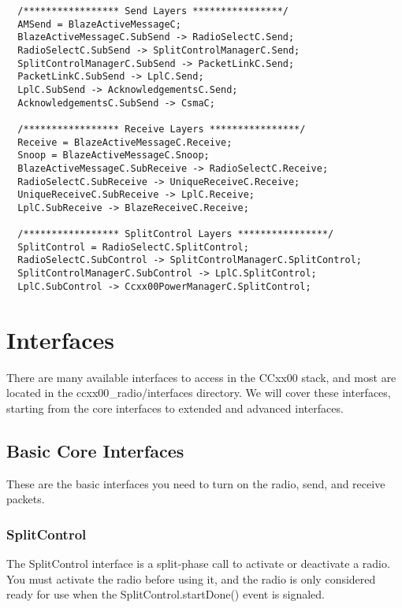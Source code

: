 \documentclass{article}
\begin{document}
\begin{verbatim}  
  /***************** Send Layers ****************/
  AMSend = BlazeActiveMessageC;
  BlazeActiveMessageC.SubSend -> RadioSelectC.Send;
  RadioSelectC.SubSend -> SplitControlManagerC.Send;
  SplitControlManagerC.SubSend -> PacketLinkC.Send;
  PacketLinkC.SubSend -> LplC.Send;
  LplC.SubSend -> AcknowledgementsC.Send;
  AcknowledgementsC.SubSend -> CsmaC;
  
  /***************** Receive Layers ****************/
  Receive = BlazeActiveMessageC.Receive;
  Snoop = BlazeActiveMessageC.Snoop;
  BlazeActiveMessageC.SubReceive -> RadioSelectC.Receive;
  RadioSelectC.SubReceive -> UniqueReceiveC.Receive;
  UniqueReceiveC.SubReceive -> LplC.Receive;
  LplC.SubReceive -> BlazeReceiveC.Receive;
    
  /***************** SplitControl Layers ****************/
  SplitControl = RadioSelectC.SplitControl;
  RadioSelectC.SubControl -> SplitControlManagerC.SplitControl;
  SplitControlManagerC.SubControl -> LplC.SplitControl;
  LplC.SubControl -> Ccxx00PowerManagerC.SplitControl;
\end{verbatim}



\section{Interfaces}
\label{sec:interfaces}
There are many available interfaces to access in the CCxx00 stack, and most are 
located in the ccxx00\_radio/interfaces directory.  We will cover
these interfaces, starting from the core interfaces to extended and advanced interfaces.

\subsection{Basic Core Interfaces}
\label{sec:coreinterfaces}
These are the basic interfaces you need to turn on the radio, send, and receive packets.

\subsubsection{SplitControl}
The SplitControl interface is a split-phase call to activate or deactivate a radio.
You must activate the radio before using it, and the radio is only considered ready for
use when the SplitControl.startDone() event is signaled.
\end{document}
